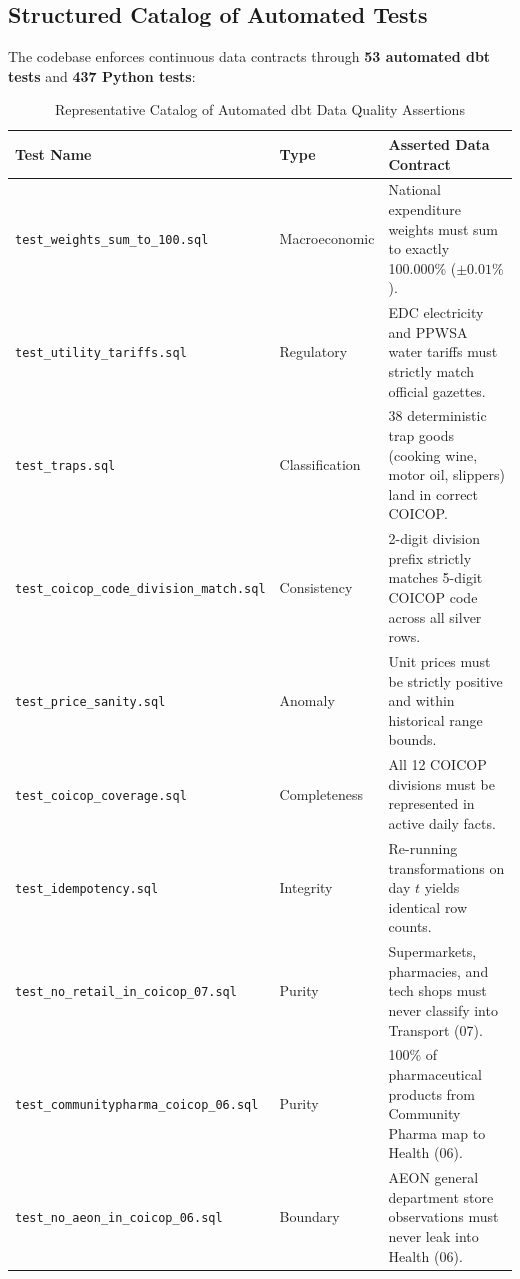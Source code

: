 \documentclass[11pt,a4paper,oneside]{article}
\begin{document}
\subsection{Structured Catalog of Automated Tests}
The codebase enforces continuous data contracts through \textbf{53 automated dbt tests} and \textbf{437 Python tests}:

\begin{table}[h]
\centering
\small
\caption{Representative Catalog of Automated dbt Data Quality Assertions}
\begin{tabular}{llp{7.5cm}}
\toprule
\textbf{Test Name} & \textbf{Type} & \textbf{Asserted Data Contract} \\
\midrule
\texttt{test\_weights\_sum\_to\_100.sql} & Macroeconomic & National expenditure weights must sum to exactly 100.000\% ($\pm 0.01\%$). \\
\texttt{test\_utility\_tariffs.sql} & Regulatory & EDC electricity and PPWSA water tariffs must strictly match official gazettes. \\
\texttt{test\_traps.sql} & Classification & 38 deterministic trap goods (cooking wine, motor oil, slippers) land in correct COICOP. \\
\texttt{test\_coicop\_code\_division\_match.sql} & Consistency & 2-digit division prefix strictly matches 5-digit COICOP code across all silver rows. \\
\texttt{test\_price\_sanity.sql} & Anomaly & Unit prices must be strictly positive and within historical range bounds. \\
\texttt{test\_coicop\_coverage.sql} & Completeness & All 12 COICOP divisions must be represented in active daily facts. \\
\texttt{test\_idempotency.sql} & Integrity & Re-running transformations on day $t$ yields identical row counts. \\
\texttt{test\_no\_retail\_in\_coicop\_07.sql} & Purity & Supermarkets, pharmacies, and tech shops must never classify into Transport (07). \\
\texttt{test\_communitypharma\_coicop\_06.sql} & Purity & 100\% of pharmaceutical products from Community Pharma map to Health (06). \\
\texttt{test\_no\_aeon\_in\_coicop\_06.sql} & Boundary & AEON general department store observations must never leak into Health (06). \\
\bottomrule
\end{tabular}
\end{table}
\end{document}
